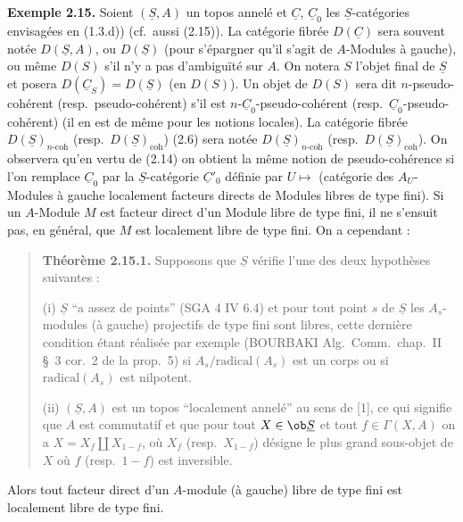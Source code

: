 \textbf{Exemple 2.15.} Soient $(\underline{S}, A)$ un topos annelé et $\underline{C}$, $\underline{C}_0$ les $\underline{S}$-catégories envisagées en (1.3.d)) (cf.\ aussi (2.15)). La catégorie fibrée $D(\underline{C})$ sera souvent notée $D(\underline{S}, A)$, ou $D(\underline{S})$ (pour s'épargner qu'il s'agit de $A$-Modules à gauche), ou même $D(S)$ s'il n'y a pas d'ambiguïté sur $A$. On notera $S$ l'objet final de $\underline{S}$ et posera $D(\underline{C}_S) = D(\underline{S})$ (en $D(S)$). Un objet de $D(S)$ sera dit $n$-pseudo-cohérent (resp.\ pseudo-cohérent) s'il est $n$-$\underline{C}_0$-pseudo-cohérent (resp.\ $\underline{C}_0$-pseudo-cohérent) (il en est de même pour les notions locales). La catégorie fibrée $D(\underline{S})_{n\text{-}\mathrm{coh}}$ (resp.\ $D(\underline{S})_{\mathrm{coh}}$) (2.6) sera notée $D(\underline{S})_{n\text{-}\mathrm{coh}}$ (resp.\ $D(\underline{S})_{\mathrm{coh}}$). On observera qu'en vertu de (2.14) on obtient la même notion de pseudo-cohérence si l'on remplace $\underline{C}_0$ par la $\underline{S}$-catégorie $\underline{C}'_0$ définie par $U \mapsto$ (catégorie des $A_U$-Modules à gauche localement facteurs directs de Modules libres de type fini). Si un $A$-Module $M$ est facteur direct d'un Module libre de type fini, il ne s'ensuit pas, en général, que $M$ est localement libre de type fini. On a cependant :

\begin{quote}
\textbf{Théorème 2.15.1.} Supposons que $\underline{S}$ vérifie l'une des deux hypothèses suivantes :

(i) $\underline{S}$ ``a assez de points'' (SGA 4 IV 6.4) et pour tout point $s$ de $\underline{S}$ les $A_s$-modules (à gauche) projectifs de type fini sont libres, cette dernière condition étant réalisée par exemple (BOURBAKI Alg.\ Comm.\ chap.\ II \S\ 3 cor.\ 2 de la prop.\ 5) si $A_s/\mathrm{radical}(A_s)$ est un corps ou si $\mathrm{radical}(A_s)$ est nilpotent.

(ii) $(\underline{S}, A)$ est un topos ``localement annelé'' au sens de [1], ce qui signifie que $A$ est commutatif et que pour tout $X \in \ob \underline{S}$ et tout $f \in \Gamma(X, A)$ on a $X = X_f \amalg X_{1-f}$, où $X_f$ (resp.\ $X_{1-f}$) désigne le plus grand sous-objet de $X$ où $f$ (resp.\ $1-f$) est inversible.
\end{quote}

Alors tout facteur direct d'un $A$-module (à gauche) libre de type fini est localement libre de type fini.

